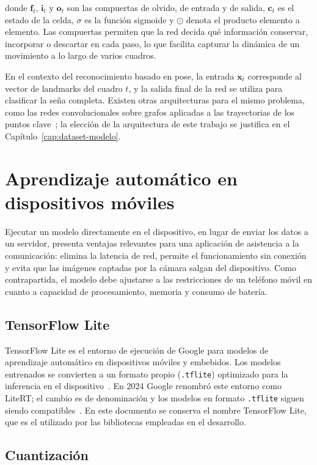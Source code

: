 donde $\mathbf{f}_t$, $\mathbf{i}_t$ y $\mathbf{o}_t$ son las compuertas de olvido, de entrada y de salida, $\mathbf{c}_t$ es el estado de la celda, $\sigma$ es la función sigmoide y $\odot$ denota el producto elemento a elemento. Las compuertas permiten que la red decida qué información conservar, incorporar o descartar en cada paso, lo que facilita capturar la dinámica de un movimiento a lo largo de varios cuadros.

En el contexto del reconocimiento basado en pose, la entrada $\mathbf{x}_t$ corresponde al vector de landmarks del cuadro $t$, y la salida final de la red se utiliza para clasificar la seña completa. Existen otras arquitecturas para el mismo problema, como las redes convolucionales sobre grafos aplicadas a las trayectorias de los puntos clave~\cite{li2020wlasl}; la elección de la arquitectura de este trabajo se justifica en el Capítulo~\ref{cap:dataset-modelo}.

\section{Aprendizaje automático en dispositivos móviles}

Ejecutar un modelo directamente en el dispositivo, en lugar de enviar los datos a un servidor, presenta ventajas relevantes para una aplicación de asistencia a la comunicación: elimina la latencia de red, permite el funcionamiento sin conexión y evita que las imágenes captadas por la cámara salgan del dispositivo. Como contrapartida, el modelo debe ajustarse a las restricciones de un teléfono móvil en cuanto a capacidad de procesamiento, memoria y consumo de batería.

\subsection{TensorFlow Lite}

TensorFlow Lite es el entorno de ejecución de Google para modelos de aprendizaje automático en dispositivos móviles y embebidos. Los modelos entrenados se convierten a un formato propio (\texttt{.tflite}) optimizado para la inferencia en el dispositivo~\cite{tensorflowLite}. En 2024 Google renombró este entorno como LiteRT; el cambio es de denominación y los modelos en formato \texttt{.tflite} siguen siendo compatibles~\cite{litert2024}. En este documento se conserva el nombre TensorFlow Lite, que es el utilizado por las bibliotecas empleadas en el desarrollo.

\subsection{Cuantización}


